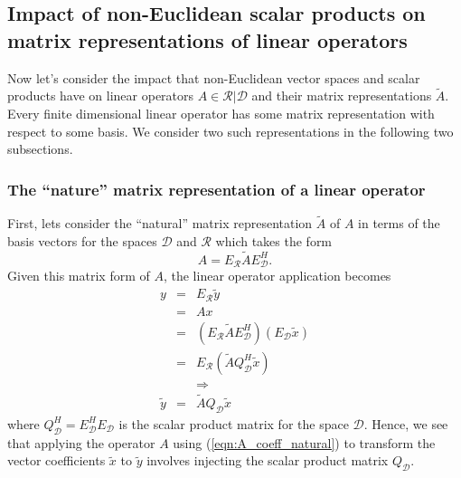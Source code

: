 \subsection{Impact of non-Euclidean scalar products on matrix representations of linear operators}
\label{sec:matrix_representations_of_linear_operators}

Now let's consider the impact that non-Euclidean vector spaces and scalar
products have on linear operators $A\in\mathcal{R}|\mathcal{D}$ and their
matrix representations $\tilde{A}$.  Every finite dimensional linear operator
has some matrix representation with respect to some basis.  We consider two
such representations in the following two subsections.

\subsubsection{The ``nature'' matrix representation of a linear operator}

First, lets consider the ``natural'' matrix representation $\tilde{A}$ of $A$
in terms of the basis vectors for the spaces $\mathcal{D}$ and $\mathcal{R}$
which takes the form
%
\begin{equation}
A = E_{\mathcal{R}} \tilde{A} E_{\mathcal{D}}^H.
\label{eqn:A_coeff_natural}
\end{equation}
%
Given this matrix form of $A$, the linear operator application becomes
%
\begin{eqnarray}
y
& = & E_{\mathcal{R}} \tilde{y} \nonumber \\
& = & A x \nonumber \\
& = & ( E_{\mathcal{R}} \tilde{A} E_{\mathcal{D}}^H ) ( E_{\mathcal{D}} \tilde{x} ) \nonumber \\
& = & E_{\mathcal{R}} ( \tilde{A} Q_{\mathcal{D}}^H \tilde{x} ) \nonumber \\
&  & \Rightarrow \nonumber \\
\tilde{y} & = & \tilde{A} Q_{\mathcal{D}} \tilde{x}
\label{eqn:A_natural_apply}
\end{eqnarray}
%
where $Q_{\mathcal{D}}^H = E_{\mathcal{D}}^H E_{\mathcal{D}}$ is the scalar
product matrix for the space $\mathcal{D}$.  Hence, we see that applying the
operator $A$ using (\ref{eqn:A_coeff_natural}) to transform the vector
coefficients $\tilde{x}$ to $\tilde{y}$ involves injecting the scalar product
matrix $Q_{\mathcal{D}}$.

